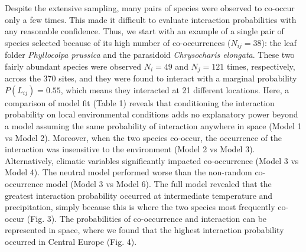 \documentclass[12pt]{article}
\begin{document}
Despite the extensive sampling, many pairs of species were observed to co-occur only a few times. This made it difficult to evaluate interaction
probabilities with any reasonable confidence. Thus, we start with an
example of a single pair of species selected because of its high number of co-occurrences ($N_{ij}=38$): the leaf folder \textit{Phyllocolpa prussica} and
the parasidoid \textit{Chrysocharis elongata}. These two fairly abundant
species were observed $N_i=49$ and $N_j=121$ times, respectively, across the
370 sites, and they were found to interact with a marginal probability
$P(L_{ij})=0.55$, which means they interacted at 21 different locations. Here,
a comparison of model fit (Table 1) reveals that conditioning the interaction
probability on local environmental conditions adds no explanatory power beyond
a model assuming the same probability of interaction anywhere in space (Model 1
vs Model 2). Moreover, when the two species co-occur, the occurrence of the
interaction was insensitive to the environment (Model 2 vs Model 3).
Alternatively, climatic variables significantly impacted co-occurrence (Model
3 vs Model 4). The neutral model performed worse than the non-random co-occurrence model (Model 3 vs Model 6). The full model revealed that the
greatest interaction probability occurred at intermediate temperature and
precipitation, simply because this is where the two species most frequently
co-occur (Fig. 3). The probabilities of co-occurrence and interaction can be
represented in space, where we found that the highest interaction probability
occurred in Central Europe (Fig. 4).
\end{document}
